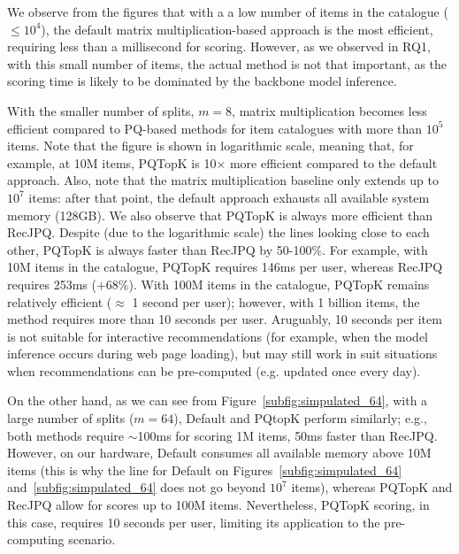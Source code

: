 \documentclass[sigconf,natbib=true, review=False]{acmart} %
\newcommand{\pageenlarge}[1]{\marginnote{#1}\enlargethispage{#1\baselineskip}}
\newcommand{\rsasha}[1]{\textcolor[HTML]{000000}{#1}}
\newcommand{\gsasha}[1]{\textcolor[HTML]{000000}{#1}}
\newcommand{\scr}[1]{\textcolor[HTML]{000000}{#1}}
\newcommand{\scrc}[1]{\textcolor[HTML]{000000}{#1}}
\begin{document}
We observe from the figures that with \scr{a} a low number of items in the catalogue ($\leq 10^4$), the default matrix multiplication-based approach is the most efficient, requiring less than a millisecond for scoring. However, as we observed in RQ1, with this small number of items, the actual method is not that important, as the scoring time is likely to be dominated by the backbone model inference. 

With the smaller number of splits, $m=8$, matrix multiplication becomes \gsasha{less efficient compared to PQ-based methods for item catalogues with more than $10^5$} items. Note that the figure is shown in logarithmic scale, meaning that, for example, at 10M items, PQTopK is \gsasha{10$\times$} more efficient compared to the default approach. Also, note that the matrix multiplication baseline only extends up to $10^7$ items: after that point, the default approach exhausts all available system memory (128GB). We also observe that PQTopK is always more efficient than RecJPQ. Despite (due to the logarithmic scale) the lines looking close to each other, PQTopK is always faster than RecJPQ by 50-100\%. For example, with 10M items in the catalogue, PQTopK requires 146ms per user, whereas \scr{RecJPQ} requires 253ms (+68\%). With 100M items in the catalogue, PQTopK remains relatively efficient ($\approx$ 1 second per user); however, with 1 billion items, the method requires more than 10 seconds \scr{per user}. \rsasha{Aruguably, 10 seconds per item is not suitable for interactive recommendations (for example, when the model inference occurs during web page loading), but may still \gsasha{work} in \gsasha{suit} situations when recommendations can be pre-computed \gsasha{(e.g. updated once every day)}. }

 On the other hand, as we can see from Figure~\ref{subfig:simpulated_64}, \gsasha{with} a large number of splits ($m=64$), \gsasha{Default} and PQtopK perform \gsasha{similarly}; \gsasha{e.g.}, both methods require  $\sim$100ms for scoring 1M items, \rsasha{50ms faster than RecJPQ}. However, \scrc{on our hardware,}  \gsasha{Default} consumes all available memory above 10M items \scrc{(this is why the line for Default on Figures~\ref{subfig:simpulated_64} and~\ref{subfig:simpulated_64} does not go beyond $10^7$ items)}, whereas PQTopK and RecJPQ allow for scores up to \scrc{100M items}. \scrc{Nevertheless}, PQTopK scoring, in this case, requires 10 seconds per user, limiting its application to the pre-computing scenario. 
\end{document}
